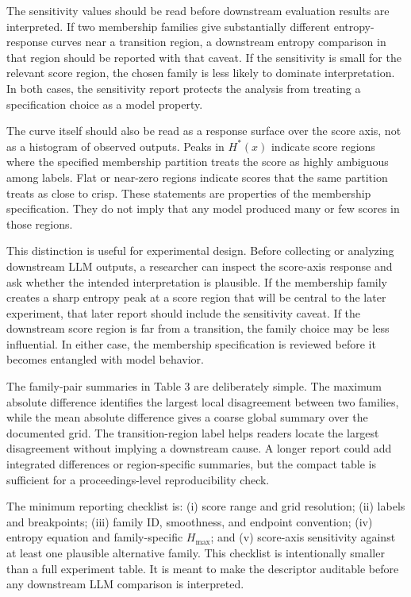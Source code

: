 \documentclass[a4paper,10pt,twocolumn]{myjarticle2}
\newcommand{\Hstar}{H^{\ast}}
\begin{document}
The sensitivity values should be read before downstream evaluation results are
interpreted. If two membership families give substantially different
entropy-response curves near a transition region, a downstream entropy
comparison in that region should be reported with that caveat. If the
sensitivity is small for the relevant score region, the chosen family is less
likely to dominate interpretation. In both cases, the sensitivity report
protects the analysis from treating a specification choice as a model property.

The curve itself should also be read as a response surface over the score axis,
not as a histogram of observed outputs. Peaks in $\Hstar(x)$ indicate score
regions where the specified membership partition treats the score as highly
ambiguous among labels. Flat or near-zero regions indicate scores that the same
partition treats as close to crisp. These statements are properties of the
membership specification. They do not imply that any model produced many or few
scores in those regions.

This distinction is useful for experimental design. Before collecting or
analyzing downstream LLM outputs, a researcher can inspect the score-axis
response and ask whether the intended interpretation is plausible. If the
membership family creates a sharp entropy peak at a score region that will be
central to the later experiment, that later report should include the
sensitivity caveat. If the downstream score region is far from a transition,
the family choice may be less influential. In either case, the membership
specification is reviewed before it becomes entangled with model behavior.

The family-pair summaries in Table 3 are deliberately simple. The maximum
absolute difference identifies the largest local disagreement between two
families, while the mean absolute difference gives a coarse global summary over
the documented grid. The transition-region label helps readers locate the
largest disagreement without implying a downstream cause. A longer report could
add integrated differences or region-specific summaries, but the compact table
is sufficient for a proceedings-level reproducibility check.

The minimum reporting checklist is: (i) score range and grid resolution;
(ii) labels and breakpoints; (iii) family ID, smoothness, and endpoint
convention; (iv) entropy equation and family-specific $H_{\max}$; and
(v) score-axis sensitivity against at least one plausible alternative family.
This checklist is intentionally smaller than a full experiment table. It is
meant to make the descriptor auditable before any downstream LLM comparison is
interpreted.
\end{document}
